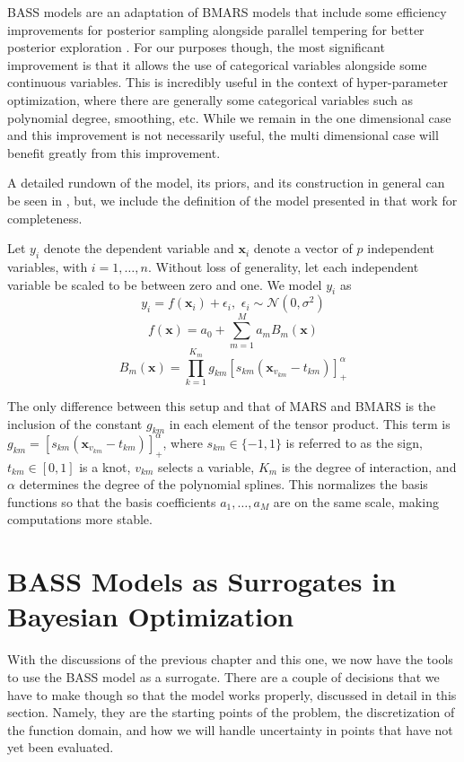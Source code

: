 BASS models are an adaptation of BMARS models that include some efficiency improvements for posterior sampling alongside parallel tempering for better posterior exploration \cite{francom2020bass}. For our purposes though, the most significant improvement is that it allows the use of categorical variables alongside some continuous variables. This is incredibly useful in the context of hyper-parameter optimization, where there are generally some categorical variables such as polynomial degree, smoothing, etc. While we remain in the one dimensional case and this improvement is not necessarily useful, the multi dimensional case will benefit greatly from this improvement. 

A detailed rundown of the model, its priors, and its construction in general can be seen in \cite{francom2020bass}, but, we include the definition of the model presented in that work for completeness. 

Let $y_i$ denote the dependent variable and $\boldsymbol{x}_i$ denote a vector of $p$ independent variables, with $i = 1, \ldots, n$. Without loss of generality, let each independent variable be scaled to be between
zero and one. We model $y_i$ as 
\[ y_i = f(\boldsymbol{x}_i) + \epsilon_i, \, \, \epsilon_i \sim \mathcal{N}(0,\sigma^2) \]
\[ f(\boldsymbol{x}) = a_0 + \sum_{m=1}^{M} a_m B_m(\boldsymbol{x}) \]
\[ B_m(\boldsymbol{x}) = \prod_{k=1}^{K_m} g_{km} [s_{km}(\boldsymbol{x}_{v_{km}} - t_{km}) ]^\alpha_+ \]

The only difference between this setup and that of MARS and BMARS is the inclusion of the constant $g_{km}$ in each element of the tensor product. This term is $g_{km}=[s_{km}(\boldsymbol{x}_{v_{km}} - t_{km}) ]^\alpha_+$, where $s_{km} \in \{-1,1\}$ is referred to as the sign, $t_{km}\in [0,1]$ is a knot, $v_{km}$ selects a variable, $K_m$ is the degree of interaction, and $\alpha$ determines the degree of the polynomial splines. This normalizes the basis functions so that the basis coefficients $a_1, \ldots, a_M$ are on the same scale, making computations more stable.

\section{BASS Models as Surrogates in Bayesian Optimization}

With the discussions of the previous chapter and this one, we now have the tools to use the BASS model as a surrogate. There are a couple of decisions that we have to make though so that the model works properly, discussed in detail in this section. Namely, they are the starting points of the problem, the discretization of the function domain, and how we will handle uncertainty in points that have not yet been evaluated. 

